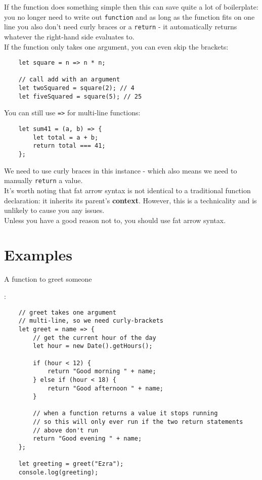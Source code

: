 If the function does something simple then this can save quite a lot of boilerplate: you no longer need to write out \texttt{function} and as long as the function fits on one line you also don't need curly braces or a \texttt{return} - it automatically returns whatever the right-hand side evaluates to.
\\


If the function only takes one argument, you can even skip the brackets:

\begin{verbatim}
    let square = n => n * n;

    // call add with an argument
    let twoSquared = square(2); // 4
    let fiveSquared = square(5); // 25
\end{verbatim}


You can still use \texttt{=>} for multi-line functions:

\begin{verbatim}
    let sum41 = (a, b) => {
        let total = a + b;
        return total === 41;
    };
\end{verbatim}

We need to use curly braces in this instance - which also means we need to manually \texttt{return} a value.
\\

It's worth noting that fat arrow syntax is not identical to a traditional function declaration: it inherits its parent's \textbf{context}. However, this is a technicality and is unlikely to cause you any issues.
\\

Unless you have a good reason not to, you should use fat arrow syntax.

\pagebreak

\section{Examples}

\hypertarget{greet}{A function to greet someone}:

\begin{verbatim}
    // greet takes one argument
    // multi-line, so we need curly-brackets
    let greet = name => {
        // get the current hour of the day
        let hour = new Date().getHours();

        if (hour < 12) {
            return "Good morning " + name;
        } else if (hour < 18) {
            return "Good afternoon " + name;
        }

        // when a function returns a value it stops running
        // so this will only ever run if the two return statements
        // above don't run
        return "Good evening " + name;
    };

    let greeting = greet("Ezra");
    console.log(greeting);
\end{verbatim}


